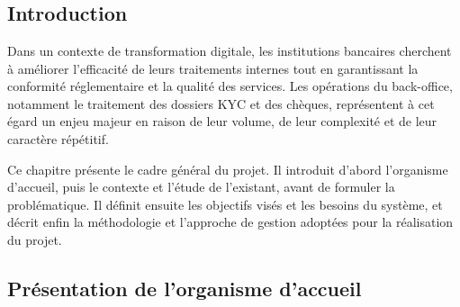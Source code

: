 \chapter*{}


\begin{center}
    \fboxrule=2pt
    \fboxsep=40pt
\end{center}
\vspace*{\fill}


\setcounter{chapter}{1}
\setcounter{section}{0}
\clearpage

\section*{Introduction}

Dans un contexte de transformation digitale, les institutions bancaires
cherchent à améliorer l'efficacité de leurs traitements internes tout en
garantissant la conformité réglementaire et la qualité des services. Les
opérations du back-office, notamment le traitement des dossiers KYC et des
chèques, représentent à cet égard un enjeu majeur en raison de leur volume,
de leur complexité et de leur caractère répétitif.

Ce chapitre présente le cadre général du projet. Il introduit d'abord
l'organisme d'accueil, puis le contexte et l'étude de l'existant, avant de
formuler la problématique. Il définit ensuite les objectifs visés et les
besoins du système, et décrit enfin la méthodologie et l'approche de
gestion adoptées pour la réalisation du projet.

\section{Présentation de l'organisme d'accueil}

